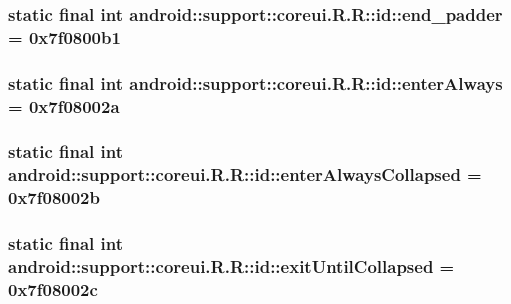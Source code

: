\hypertarget{classandroid_1_1support_1_1coreui_1_1_r_1_1id_621bd15799990f7389611f81247426cb}{
\subsubsection[{end\_\-padder}]{\setlength{\rightskip}{0pt plus 5cm}static final int android::support::coreui.R.R::id::end\_\-padder = 0x7f0800b1}}
\label{classandroid_1_1support_1_1coreui_1_1_r_1_1id_621bd15799990f7389611f81247426cb}


\hypertarget{classandroid_1_1support_1_1coreui_1_1_r_1_1id_f22a3979532c3ebf70dcd9c3f25854bf}{
\subsubsection[{enterAlways}]{\setlength{\rightskip}{0pt plus 5cm}static final int android::support::coreui.R.R::id::enterAlways = 0x7f08002a}}
\label{classandroid_1_1support_1_1coreui_1_1_r_1_1id_f22a3979532c3ebf70dcd9c3f25854bf}


\hypertarget{classandroid_1_1support_1_1coreui_1_1_r_1_1id_79aa76dbf0d4880a0813b0d6e24b7d7a}{
\subsubsection[{enterAlwaysCollapsed}]{\setlength{\rightskip}{0pt plus 5cm}static final int android::support::coreui.R.R::id::enterAlwaysCollapsed = 0x7f08002b}}
\label{classandroid_1_1support_1_1coreui_1_1_r_1_1id_79aa76dbf0d4880a0813b0d6e24b7d7a}


\hypertarget{classandroid_1_1support_1_1coreui_1_1_r_1_1id_c9b250fad58688f0a5eda646f51cb45e}{
\subsubsection[{exitUntilCollapsed}]{\setlength{\rightskip}{0pt plus 5cm}static final int android::support::coreui.R.R::id::exitUntilCollapsed = 0x7f08002c}}
\label{classandroid_1_1support_1_1coreui_1_1_r_1_1id_c9b250fad58688f0a5eda646f51cb45e}


